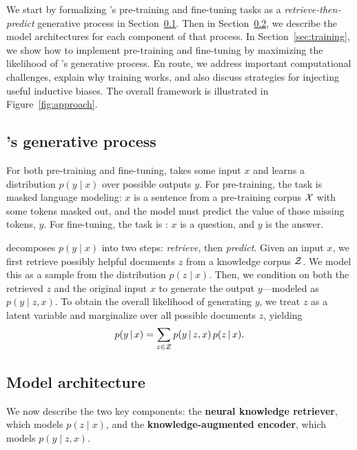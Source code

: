 \documentclass{article}
\begin{document}
We start by formalizing \thename's pre-training and fine-tuning tasks as a {\em retrieve-then-predict} generative process in Section~\ref{sec:generative_process}. Then in Section~\ref{sec:model_architecture}, we describe the model architectures for each component of that process. In Section~\ref{sec:training}, we show how to implement \thename pre-training and fine-tuning by maximizing the likelihood of \thename's generative process. En route, we address important computational challenges, explain why training works, and also discuss strategies for injecting useful inductive biases. The overall framework is illustrated in Figure~\ref{fig:approach}.


\subsection{\thename's generative process}
\label{sec:generative_process}
For both pre-training and fine-tuning, \thename takes some input $x$ and learns a distribution $p(y \mid x)$ over possible outputs $y$. For pre-training, the task is masked language modeling: $x$ is a sentence from a pre-training corpus $\mathcal{X}$ with some tokens masked out, and the model must predict the value of those missing tokens, $y$. For fine-tuning, the task is \openqa: $x$ is a question, and $y$ is the answer.

\thename decomposes $p(y\mid x)$ into two steps: {\em retrieve}, then {\em predict}. Given an input $x$, we first retrieve possibly helpful documents $z$ from a knowledge corpus $\mathcal{Z}$. We model this as a sample from the distribution $p(z\mid x)$. Then, we condition on both the retrieved $z$ and the original input $x$ to generate the output $y$---modeled as $p(y\mid z,x)$. To obtain the overall likelihood of generating $y$, we treat $z$ as a latent variable and marginalize over all possible documents $z$, yielding \begin{equation}
p(y \,|\, x) = \sum_{z \in \mathcal{Z}} p(y \,|\, z, x)\, p(z \,|\, x). \label{eqn:marginal}
\end{equation}

\subsection{Model architecture}
\label{sec:model_architecture}
We now describe the two key components: the \textbf{neural knowledge retriever}, which models $p(z\mid x)$, and the \textbf{knowledge-augmented encoder}, which models $p(y\mid z,x)$.
\end{document}
